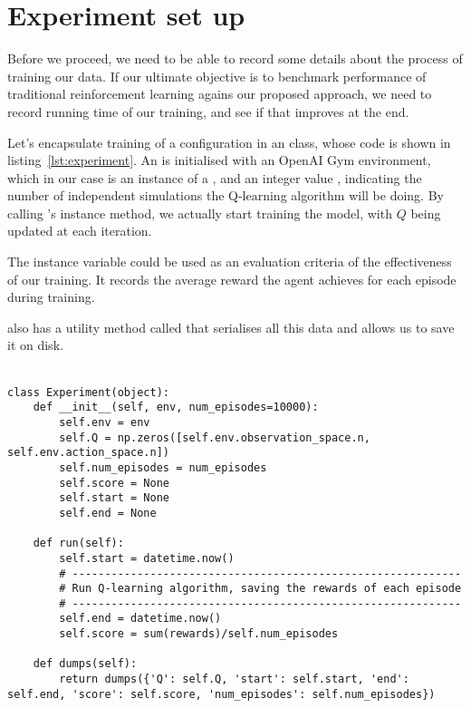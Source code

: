 
\section{Experiment set up}
Before we proceed, we need to be able to record some details about the process of training our data. If our ultimate objective is to benchmark performance of traditional reinforcement learning agains our proposed approach, we need to record running time of our training, and see if that improves at the end. 

Let's encapsulate training of a configuration in an  class, whose code is shown in listing~\ref{lst:experiment}. An  is initialised with an OpenAI Gym environment, which in our case is an instance of a , and an integer value , indicating the number of independent simulations the Q-learning algorithm will be doing. By calling 's  instance method, we actually start training the model, with $Q$ being updated at each iteration.

The instance variable  could be used as an evaluation criteria of the effectiveness of our training. It records the average reward the agent achieves for each episode during training.

 also has a utility method called  that serialises all this data and allows us to save it on disk.
\\\\
\begin{minipage}{\linewidth}
\lstset{language=Python}
\lstset{frame=lines}
\lstset{basicstyle=\footnotesize}
\begin{lstlisting}
class Experiment(object):
    def __init__(self, env, num_episodes=10000):
        self.env = env
        self.Q = np.zeros([self.env.observation_space.n, self.env.action_space.n])
        self.num_episodes = num_episodes
        self.score = None
        self.start = None
        self.end = None
            
    def run(self):
        self.start = datetime.now()
        # ------------------------------------------------------------
        # Run Q-learning algorithm, saving the rewards of each episode
        # ------------------------------------------------------------
        self.end = datetime.now()
        self.score = sum(rewards)/self.num_episodes
        
    def dumps(self):
        return dumps({'Q': self.Q, 'start': self.start, 'end': self.end, 'score': self.score, 'num_episodes': self.num_episodes})
\end{lstlisting}
\end{minipage}


